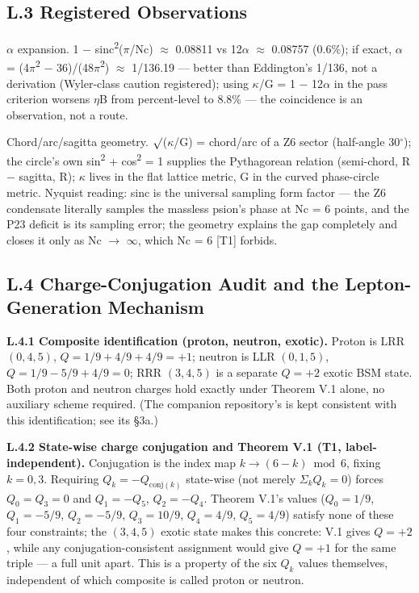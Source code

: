 \documentclass[11pt,letterpaper]{article}
\begin{document}
\subsection*{L.3  Registered Observations}

$\alpha$ expansion. 1 $-$ sinc\textsuperscript{2}($\pi$/Nc) $\approx$ 0.08811 vs 12$\alpha$ $\approx$ 0.08757 (0.6\%); if exact, $\alpha$ = (4$\pi$\textsuperscript{2} $-$ 36)/(48$\pi$\textsuperscript{2}) $\approx$ 1/136.19 --- better than Eddington's 1/136, not a derivation (Wyler-class caution registered); using $\kappa$/G = 1 $-$ 12$\alpha$ in the pass criterion worsens $\eta$B from percent-level to 8.8\% --- the coincidence is an observation, not a route.

\noindent Chord/arc/sagitta geometry. $\surd$($\kappa$/G) = chord/arc of a Z6 sector (half-angle 30$^{\circ}$); the circle's own sin\textsuperscript{2} + cos\textsuperscript{2} = 1 supplies the Pythagorean relation (semi-chord, R $-$ sagitta, R); $\kappa$ lives in the flat lattice metric, G in the curved phase-circle metric. Nyquist reading: sinc is the universal sampling form factor --- the Z6 condensate literally samples the massless psion's phase at Nc = 6 points, and the P23 deficit is its sampling error; the geometry explains the gap completely and closes it only as Nc $\to$ $\infty$, which Nc = 6 [T1] forbids.

\subsection*{L.4  Charge-Conjugation Audit and the Lepton-Generation Mechanism}

\noindent \textbf{L.4.1 Composite identification (proton, neutron, exotic).} Proton is LRR $(0,4,5)$, $Q=1/9+4/9+4/9=+1$; neutron is LLR $(0,1,5)$, $Q=1/9-5/9+4/9=0$; RRR $(3,4,5)$ is a separate $Q=+2$ exotic BSM state. Both proton and neutron charges hold exactly under Theorem V.1 alone, no auxiliary scheme required. (The companion repository's  is kept consistent with this identification; see its \S3a.)

\noindent \textbf{L.4.2 State-wise charge conjugation and Theorem V.1 (T1, label-independent).} Conjugation is the index map $k\to(6-k)\bmod 6$, fixing $k=0,3$. Requiring $Q_k=-Q_{\mathrm{conj}(k)}$ state-wise (not merely $\Sigma_k Q_k=0$) forces $Q_0=Q_3=0$ and $Q_1=-Q_5$, $Q_2=-Q_4$. Theorem V.1's values ($Q_0=1/9$, $Q_1=-5/9$, $Q_2=-5/9$, $Q_3=10/9$, $Q_4=4/9$, $Q_5=4/9$) satisfy none of these four constraints; the $(3,4,5)$ exotic state makes this concrete: V.1 gives $Q=+2$, while any conjugation-consistent assignment would give $Q=+1$ for the same triple --- a full unit apart. This is a property of the six $Q_k$ values themselves, independent of which composite is called proton or neutron.
\end{document}
